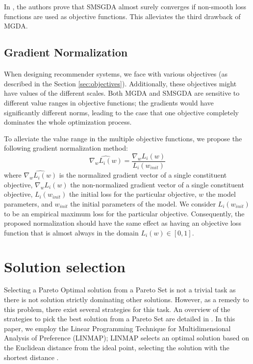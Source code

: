 \documentclass[letterpaper]{article}
\begin{document}
In \cite{poirion:hal-01660788}, the authors prove that SMSGDA almost surely converges if non-smooth loss functions are used as objective functions. This alleviates the third drawback of MGDA.

\subsection{Gradient Normalization}
\paragraph{}

When designing recommender systems, we face with various objectives (as described in the Section \ref{sec:objectives}). Additionally, these objectives might have values of the different scales. Both MGDA and SMSGDA are sensitive to different value ranges in objective functions; the gradients would have significantly different norms, leading to the case that one objective completely dominates the whole optimization process.

To alleviate the value range in the multiple objective functions, we propose the following gradient normalization method:
\begin{equation}
    \hat{\nabla_{w}L_i(w)} = \frac{\nabla_{w} L_i(w)}{L_i(w_{init})}
\end{equation}
where $\hat{\nabla_{w}L_i(w)}$ is the normalized gradient vector of a single constituent objective, ${\nabla_{w}L_i(w)}$ the non-normalized gradient vector of a single constituent objective, $L_i(w_{init})$ the initial loss for the particular objective, $w$ the model parameters, and $w_{init}$ the initial parameters of the model. We consider $L_i(w_{init})$ to be an empirical maximum loss for the particular objective. Consequently, the proposed normalization should have the same effect as having an objective loss function that is almost always in the domain $L_i(w) \in [0, 1]$.



\section{Solution selection}

Selecting a Pareto Optimal solution from a Pareto Set is not a trivial task as there is not solution strictly dominating other solutions. However, as a remedy to this problem, there exist several strategies for this task. An overview of the strategies to pick the best solution from a Pareto Set are detailed in \cite{doi:10.1021/acs.iecr.6b03453}. In this paper, we employ the Linear Programming Technique for Multidimensional Analysis of Preference (LINMAP); LINMAP selects an optimal solution based on the Euclidean distance from the ideal point, selecting the solution with the shortest distance \cite{Srinivasan1973}.
\end{document}
